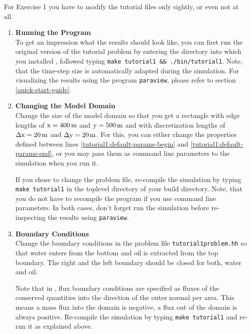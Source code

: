 \renewcommand{\labelenumi}{\alph{enumi})}

For Exercise 1 you have to modify the tutorial files only sightly, or
even not at all.

\begin{enumerate}

\item \textbf{Running the Program} \\
  To get an impression what the results should look like, you can
  first run the original version of the tutorial problem by entering
  the directory into which you installed \eWoms, followed typing
  \texttt{make tutorial1 \&\& ./bin/tutorial1}.  Note, that the
  time-step size is automatically adapted during the simulation.  For
  visualizing the results using the program \texttt{paraview}, please
  refer to section \ref{quick-start-guide}.

\item \textbf{Changing the Model Domain} \\
  Change the size of the model domain so that you get a rectangle with
  edge lengths of $\text{x} = \unit[400]{m}$ and $\text{y} =
  \unit[500]{m}$ and with discretization lengths of $\Delta \text{x} =
  \unit[20]{m}$ and $\Delta \text{y} = \unit[20]{m}$. For this, you can
  either change the properties defined between lines
  \ref{tutorial1:default-params-begin} and
  \ref{tutorial1:default-params-end}, or you may pass them as
  command line parameters to the simulation when you run it.

  If you chose to change the problem file, re-compile the simulation
  by typing \texttt{make tutorial1} in the toplevel directory of your
  \eWoms build directory.  Note, that you do not have to recompile the
  program if you use command line parameters. In both cases, don't
  forget run the simulation before re-inspecting the results using
  \texttt{paraview}.

\item \textbf{Boundary Conditions} \\
  Change the boundary conditions in the problem file
  \texttt{tutorial1problem.hh} so that water enters from the
  bottom and oil is extracted from the top boundary. The right and the
  left boundary should be closed for both, water and oil.

  Note that in \eWoms, flux boundary conditions are specified as
  fluxes of the conserved quantities into the direction of the outer
  normal per area. This means a mass flux into the domain is negative,
  a flux out of the domain is always positive. Re-compile the
  simulation by typing \texttt{make tutorial1} and re-run it
  as explained above.


\end{enumerate}
